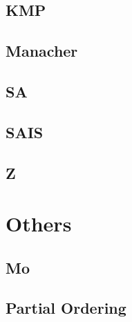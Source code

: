 \documentclass[a4paper,10pt,twocolumn,oneside]{article}
\begin{document}
\subsection{KMP}


\subsection{Manacher}


\subsection{SA}


%

\subsection{SAIS}


\subsection{Z}


\section{Others}
\subsection{Mo}


\subsection{Partial Ordering}

\end{document}
